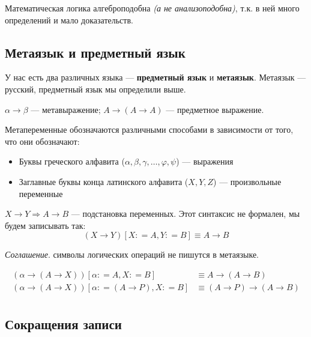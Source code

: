 \begin{remark}
    Математическая логика алгеброподобна \textit{(а не анализоподобна)}, т.к. в ней много определений и мало доказательств.
\end{remark}

\subsection{Метаязык и предметный язык}

У нас есть два различных языка --- \textbf{предметный язык} и \textbf{метаязык}. Метаязык --- русский, предметный язык мы определили выше.

\begin{example}
    \(\alpha \to \beta\) --- метавыражение; \(A \to (A \to A)\) --- предметное выражение.
\end{example}

\begin{obozn}
    Метапеременные обозначаются различными способами в зависимости от того, что они обозначают:
    \begin{itemize}
        \item Буквы греческого алфавита (\(\alpha, \beta, \gamma, \dots, \varphi, \psi\)) --- выражения
        \item Заглавные буквы конца латинского алфавита (\(X, Y, Z\)) --- произвольные переменные
    \end{itemize}
\end{obozn}

\begin{example}
    \(X \to Y \Rightarrow A \to B\) --- подстановка переменных. Этот синтаксис не формален, мы будем записывать так:
    \[(X \to Y)[X : = A, Y : = B]\equiv A \to B\]
\end{example}

\textit{Соглашение}. символы логических операций не пишутся в метаязыке.

\begin{example}
    \begin{align*}
        (\alpha \to (A \to X))[\alpha : = A, X : = B]         & \equiv A \to (A \to B)         \\
        (\alpha \to (A \to X))[\alpha : = (A \to P), X : = B] & \equiv (A \to P) \to (A \to B) \\
    \end{align*}
\end{example}

\subsection{Сокращения записи}

